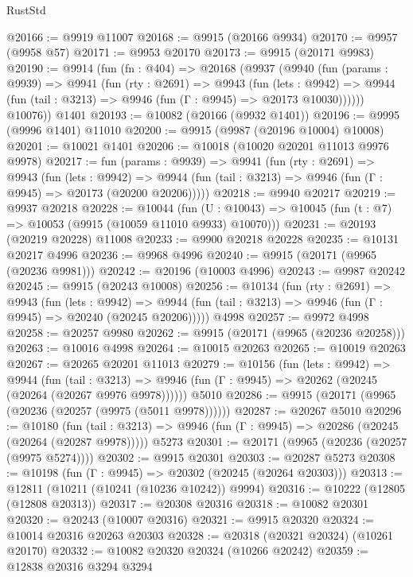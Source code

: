 \begin{lexlean}{RustStd}
\begin{coremodule}
{\begin{coremodule}
{{{{{{{{{{{{{{{{{{{{{{{{{@20166 := @9919 @11007
@20168 := @9915 (@20166 @9934)
@20170 := @9957 (@9958 @57)
@20171 := @9953 @20170
@20173 := @9915 (@20171 @9983)
@20190 := @9914
    (fun (fn : @404) =>
    @20168
      (@9937
        (@9940
          (fun (params : @9939) =>
          @9941
            (fun (rty : @2691) =>
            @9943
              (fun (lets : @9942) =>
              @9944 (fun (tail : @3213) => @9946 (fun (Γ : @9945) => @20173 @10030))))))
        @10076))
    @1401
@20193 := @10082 (@20166 (@9932 @1401))
@20196 := @9995 (@9996 @1401) @11010
@20200 := @9915 (@9987 (@20196 @10004) @10008)
@20201 := @10021 @1401
@20206 := @10018 (@10020 @20201 @11013 @9976 @9978)
@20217 := fun (params : @9939) =>
  @9941
    (fun (rty : @2691) =>
    @9943
      (fun (lets : @9942) =>
      @9944 (fun (tail : @3213) => @9946 (fun (Γ : @9945) => @20173 (@20200 @20206)))))
@20218 := @9940 @20217
@20219 := @9937 @20218
@20228 := @10044
    (fun (U : @10043) => @10045 (fun (t : @7) => @10053 (@9915 (@10059 @11010 @9933) @10070)))
@20231 := @20193 (@20219 @20228) @11008
@20233 := @9900 @20218 @20228
@20235 := @10131 @20217 @4996
@20236 := @9968 @4996
@20240 := @9915 (@20171 (@9965 (@20236 @9981)))
@20242 := @20196 (@10003 @4996)
@20243 := @9987 @20242
@20245 := @9915 (@20243 @10008)
@20256 := @10134
    (fun (rty : @2691) =>
    @9943
      (fun (lets : @9942) =>
      @9944 (fun (tail : @3213) => @9946 (fun (Γ : @9945) => @20240 (@20245 @20206)))))
    @4998
@20257 := @9972 @4998
@20258 := @20257 @9980
@20262 := @9915 (@20171 (@9965 (@20236 @20258)))
@20263 := @10016 @4998
@20264 := @10015 @20263
@20265 := @10019 @20263
@20267 := @20265 @20201 @11013
@20279 := @10156
    (fun (lets : @9942) =>
    @9944
      (fun (tail : @3213) =>
      @9946 (fun (Γ : @9945) => @20262 (@20245 (@20264 (@20267 @9976 @9978))))))
    @5010
@20286 := @9915 (@20171 (@9965 (@20236 (@20257 (@9975 (@5011 @9978))))))
@20287 := @20267 @5010
@20296 := @10180
    (fun (tail : @3213) => @9946 (fun (Γ : @9945) => @20286 (@20245 (@20264 (@20287 @9978)))))
    @5273
@20301 := @20171 (@9965 (@20236 (@20257 (@9975 @5274))))
@20302 := @9915 @20301
@20303 := @20287 @5273
@20308 := @10198 (fun (Γ : @9945) => @20302 (@20245 (@20264 @20303)))
@20313 := @12811 (@10211 (@10241 (@10236 @10242)) @9994)
@20316 := @10222 (@12805 (@12808 @20313))
@20317 := @20308 @20316
@20318 := @10082 @20301
@20320 := @20243 (@10007 @20316)
@20321 := @9915 @20320
@20324 := @10014 @20316 @20263 @20303
@20328 := @20318 (@20321 @20324) (@10261 @20170)
@20332 := @10082 @20320 @20324 (@10266 @20242)
@20359 := @12838
    @20316
    @3294
    @3294
}}}}}}}}}}}}}}}}}}}}}}}}}
\end{coremodule}}
\end{coremodule}
\end{lexlean}
